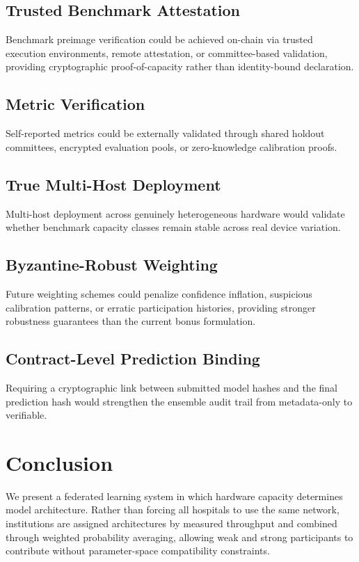 \documentclass[conference]{IEEEtran}
\begin{document}
\subsection{Trusted Benchmark Attestation}

Benchmark preimage verification could be achieved on-chain via trusted execution environments, remote attestation, or committee-based validation, providing cryptographic proof-of-capacity rather than identity-bound declaration.

\subsection{Metric Verification}

Self-reported metrics could be externally validated through shared holdout committees, encrypted evaluation pools, or zero-knowledge calibration proofs.

\subsection{True Multi-Host Deployment}

Multi-host deployment across genuinely heterogeneous hardware would validate whether benchmark capacity classes remain stable across real device variation.

\subsection{Byzantine-Robust Weighting}

Future weighting schemes could penalize confidence inflation, suspicious calibration patterns, or erratic participation histories, providing stronger robustness guarantees than the current bonus formulation.

\subsection{Contract-Level Prediction Binding}

Requiring a cryptographic link between submitted model hashes and the final prediction hash would strengthen the ensemble audit trail from metadata-only to verifiable.

\section{Conclusion}

We present a federated learning system in which hardware capacity determines model architecture. Rather than forcing all hospitals to use the same network, institutions are assigned architectures by measured throughput and combined through weighted probability averaging, allowing weak and strong participants to contribute without parameter-space compatibility constraints.
\end{document}

